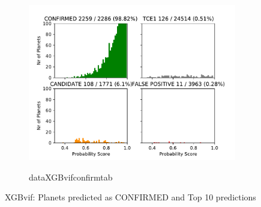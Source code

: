 \begin{figure}[H]
                \centering
                \begin{subfigure}{1\textwidth}
                \includegraphics[width = 1\textwidth]{data/XGB_vif_pred_CONFIRMED.pdf}
                \end{subfigure}
                \begin{subfigure}{1\textwidth}
                \csname dataXGBvifconfirmtab\endcsname
                \end{subfigure}
                \caption{XGBvif: Planets predicted as CONFIRMED and Top 10 predictions}
                \label{fig:data/XGB_vif_pred_CONFIRMED}
                \end{figure}